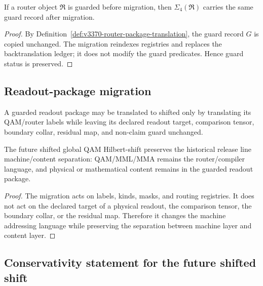 \begin{lemma}
\label{lem:v3370-router-guard-preservation}
If a router object $\mathfrak R$ is guarded before migration, then
$\Sigma_{4}(\mathfrak R)$ carries the same guard record after migration.
\end{lemma}

\begin{proof}
By Definition~\ref{def:v3370-router-package-translation}, the guard record
$G$ is copied unchanged. The migration reindexes registries and replaces the
backtranslation ledger; it does not modify the guard predicates. Hence guard
status is preserved.
\end{proof}

\subsection{Readout-package migration}
\label{subsec:v3370-readout-package-migration}

\begin{definition}
\label{def:v3370-readout-package-translation}
A guarded readout package may be translated to shifted only by translating its
QAM/router labels while leaving its declared readout target, comparison tensor,
boundary collar, residual map, and non-claim guard unchanged.
\end{definition}

\begin{proposition}
\label{prop:v3370-machine-content-preservation}
The future shifted global QAM Hilbert-shift preserves the historical release line machine/content
separation: QAM/MML/MMA remains the router/compiler language, and physical or
mathematical content remains in the guarded readout package.
\end{proposition}

\begin{proof}
The migration acts on labels, kinds, masks, and routing registries. It does not
act on the declared target of a physical readout, the comparison tensor, the
boundary collar, or the residual map. Therefore it changes the machine
addressing language while preserving the separation between machine layer and
content layer.
\end{proof}

\subsection{Conservativity statement for the future shifted shift}
\label{subsec:v3370-conservativity-statement-future-shifted-shift}

